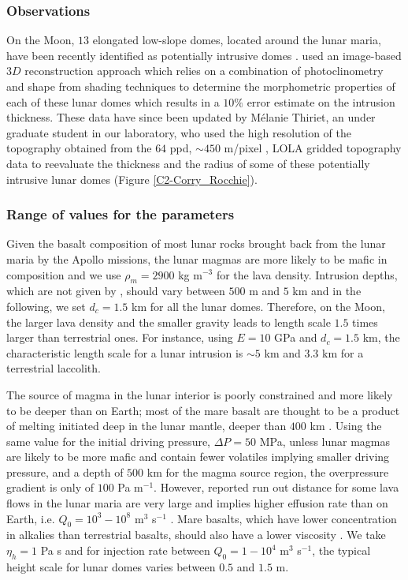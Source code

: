 \subsubsection*{Observations}

On the Moon, $13$ elongated  low-slope domes, located around the lunar
maria, have  been recently  identified as potentially  intrusive domes
\citep{Wohler:2007it,Wohler:2009jj}.   \citet{Wohler:2009jj}  used  an
image-based $3D$ reconstruction approach which relies on a combination
of photoclinometry and shape from  shading techniques to determine the
morphometric properties of each of  these lunar domes which results in
a $10\%$  error estimate on  the intrusion thickness. These  data have
since been  updated by Mélanie  Thiriet, an under graduate  student in
our  laboratory,  who  used  the high  resolution  of  the  topography
obtained from  the $64$ ppd, $\sim  450$ m/pixel \citep{Zuber:2009bq},
LOLA  gridded topography  data  to reevaluate  the  thickness and  the
radius  of some  of these  potentially intrusive  lunar domes  (Figure
\ref{C2-Corry_Rocchie}).

\subsubsection*{Range of values for the parameters}

Given the basalt composition of most lunar rocks brought back from the
lunar maria by  the Apollo missions, the lunar magmas  are more likely
to be mafic in composition and we  use $\rho_m = 2900$ kg m$^{-3}$ for
the  lava  density.    Intrusion  depths,  which  are   not  given  by
\citet{Wohler:2009jj}, should vary  between $500$ m and $5$  km and in
the following, we set $d_c=1.5$ km for all the lunar domes. Therefore,
on the Moon, the larger lava  density and the smaller gravity leads to
length scale $1.5$ times larger  than terrestrial ones.  For instance,
using $E=10$ GPa  and $d_c = 1.5$ km, the  characteristic length scale
for a lunar  intrusion is $\sim 5$  km and $3.3$ km  for a terrestrial
laccolith.

The source  of magma in the  lunar interior is poorly  constrained and
more likely to  be deeper than on  Earth; most of the  mare basalt are
thought to be a product of melting initiated deep in the lunar mantle,
deeper than $400$ km \citep{Shearer:2006gg}.  Using the same value for
the initial driving pressure, $\Delta P = 50$ MPa, unless lunar magmas
are  likely to  be  more  mafic and  contain  fewer volatiles  implying
smaller driving pressure, and a depth of $500$ km for the magma source
region,  the  overpressure gradient  is  only  of $100$  Pa  m$^{-1}$.
However, reported  run out distance for  some lava flows in  the lunar
maria are very  large and implies higher effusion rate  than on Earth,
i.e.             $Q_0=10^3-10^8$             m$^3$            s$^{-1}$
\citep{Crisp:1990gf,Zimbelman:1998ww}.  Mare basalts, which have lower
concentration in alkalies than terrestrial basalts, should also have a
lower viscosity \citep{Zimbelman:1998ww}.  We take $\eta_h=1$ Pa s and
for injection rate between  $Q_0=1-10^4$ m$^{3}$ s$^{-1}$, the typical
height scale for lunar domes varies between $0.5$ and $1.5$ m.

